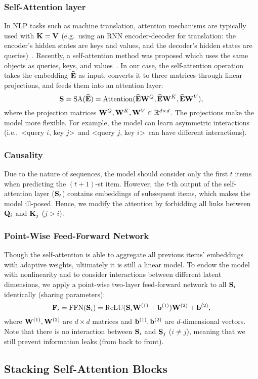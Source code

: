 \documentclass[conference]{IEEEtran}
\def\b{{\bf b}}
\def\E{{\bf E}}
\def\F{{\bf F}}
\def\K{{\bf K}}
\def\Q{{\bf Q}}
\def\S{{\bf S}}
\def\V{{\bf V}}
\def\W{{\bf W}}
\newcommand{\xhdr}[1]{\subsubsection*{\bf #1}}
\begin{document}
\xhdr{Self-Attention layer} In NLP tasks 
such as
machine translation,
attention mechanisms
are typically used
with $\K=\V$ (e.g.~using an RNN encoder-decoder for translation: the encoder's
hidden states
are keys and values, and the decoder's
hidden states
are queries)~\cite{DBLP:journals/corr/BahdanauCB14}. 
Recently, a self-attention method was proposed which uses the same objects as queries, keys, and values~\cite{transform}. In our case, the self-attention operation takes the embedding $\widehat{\E}$ as input, converts it to three matrices through linear projections, and feeds them into an attention layer:
\begin{equation}
\S=\text{SA}(\widehat{\E})=\text{Attention}(\widehat{\E}\W^Q,\widehat{\E}\W^K,\widehat{\E}\W^V),
\label{eq:sa}
\end{equation}
where the projection matrices $\W^Q,\W^K,\W^V\in\mathbb{R}^{d\times d}$. The projections make the model more flexible. For example, the model can learn asymmetric interactions (i.e.,~\textless query $i$, key $j$\textgreater~and \textless query $j$, key $i$\textgreater~can have different interactions).


\xhdr{Causality} Due to the nature of sequences, the model should consider only the first $t$ items when
predicting
the $(t+1)$-st item. However, the $t$-th output of the self-attention layer ($\S_t$) contains embeddings of subsequent items, which makes the model 
ill-posed.
Hence, we modify the attention by forbidding all links between $\Q_i$ and $\K_j$ ($j>i$).

\xhdr{Point-Wise Feed-Forward Network} Though the self-attention is able to aggregate all previous items' embeddings with adaptive weights, ultimately 
it is
still a linear model. To endow the model with 
nonlinearity and 
to
consider interactions between different latent dimensions, 
we apply
a point-wise two-layer feed-forward network 
to all $\S_i$
identically (sharing parameters):
\begin{equation}
\F_i = \text{FFN}(\S_i)=\text{ReLU}(\S_i\W^{(1)}+\b^{(1)})\W^{(2)}+\b^{(2)},
\label{eq:ffn}
\end{equation}
where $\W^{(1)},\W^{(2)}$ are $d\times d$ matrices and $\b^{(1)},\b^{(2)}$ are $d$-dimensional vectors. Note that 
there is no interaction between $\S_i$ and $\S_j$ ($i\neq j$), meaning that we still prevent 
information leaks (from back to front).


\subsection{Stacking Self-Attention Blocks}
\end{document}
